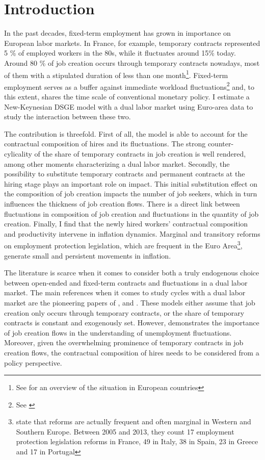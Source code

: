 \section*{Introduction}

In the past decades, fixed-term employment has grown in importance on European labor markets. In France, for example, temporary contracts represented 5 \% of employed workers in the 80s, while it fluctuates around 15\% today. Around 80 \% of job creation occurs through temporary contracts nowadays, most of them with a stipulated duration of less than one month\footnote{See \citet{fontaine2016cdd} for an overview of the situation in European countries}. Fixed-term employment serves as a buffer against immediate workload fluctuations\footnote{See \citet{doi:10.1111/iere.12167} } and, to this extent, shares the time scale of conventional monetary policy. I estimate a New-Keynesian DSGE model with a dual labor market using Euro-area data to study the interaction between these two.

The contribution is threefold. First of all, the model is able to account for the contractual composition of hires and its fluctuations. The strong counter-cylicality of the share of temporary contracts in job creation is well rendered, among other moments characterizing a dual labor market. Secondly, the possibility to substitute temporary contracts and permanent contracts at the hiring stage plays an important role on impact. This initial substitution effect on the composition of job creation impacts the number of job seekers, which in turn influences the thickness of job creation flows. There is a direct link between fluctuations in composition of job creation and fluctuations in the quantity of job creation. Finally, I find that the newly hired workers' contractual composition and productivity intervene in inflation dynamics. Marginal and transitory reforms on employment protection legislation, which are frequent in the Euro Area\footnote{\citet{fontaine2016cdd} state that reforms are actually frequent and often marginal in Western and Southern Europe. Between 2005 and 2013, they count 17 employment protection legislation reforms in France, 49 in Italy, 38 in Spain, 23 in Greece and 17 in Portugal}, generate small and persistent movements in inflation.

The literature is scarce when it comes to consider both a truly endogenous choice between open-ended and fixed-term contracts and fluctuations in a dual labor market. The main references when it comes to study cycles with a dual labor market are the pioneering papers of \citet{sala2009flexibility}, \citet{RePEc:bde:journl:y:2010:i:04:n:04} and \citet{SJOE:SJOE1715}. These models either assume that job creation only occurs through temporary contracts, or the share of temporary contracts is constant and exogenously set. However, \citet{shimer2005cyclical} demonstrates the importance of job creation flows in the understanding of unemployment fluctuations. Moreover, given the overwhelming prominence of temporary contracts in job creation flows, the contractual composition of hires needs to be considered from a policy perspective.

